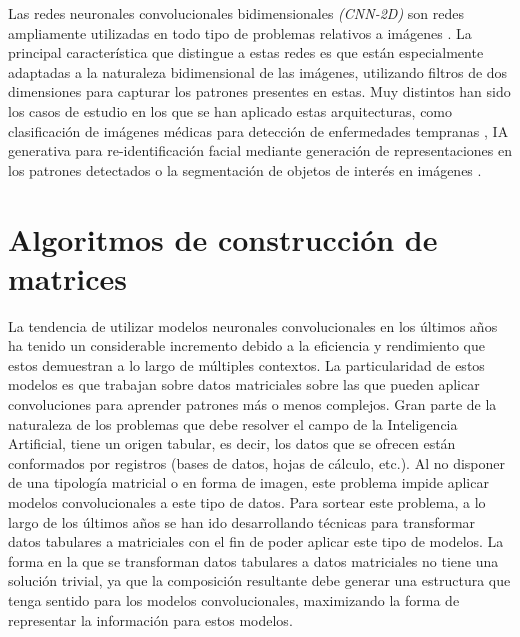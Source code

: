 Las redes neuronales convolucionales bidimensionales \textit{(CNN-2D)} son redes ampliamente utilizadas en todo tipo de problemas relativos a imágenes \cite{9451544}. La principal característica que distingue a estas redes es que están especialmente adaptadas a la naturaleza bidimensional de las imágenes, utilizando filtros de dos dimensiones para capturar los patrones presentes en estas. Muy distintos han sido los casos de estudio en los que se han aplicado estas arquitecturas, como clasificación de imágenes médicas para detección de enfermedades tempranas \cite{7064414}, IA generativa para re-identificación facial \cite{6909616} mediante generación de representaciones en los patrones detectados o la segmentación de objetos de interés en imágenes \cite{long2015fully}.

\section{Algoritmos de construcción de matrices}
\label{SOAT_MATRIX_ALGORITHM_CONSTRUCTION}

La tendencia de utilizar modelos neuronales convolucionales en los últimos años ha tenido un considerable incremento debido a la eficiencia y rendimiento que estos demuestran a lo largo de múltiples contextos. La particularidad de estos modelos es que trabajan sobre datos matriciales sobre las que pueden aplicar convoluciones para aprender patrones más o menos complejos. Gran parte de la naturaleza de los problemas que debe resolver el campo de la Inteligencia Artificial, tiene un origen tabular, es decir, los datos que se ofrecen están conformados por registros (bases de datos, hojas de cálculo, etc.). Al no disponer de una tipología matricial o en forma de imagen, este problema impide aplicar modelos convolucionales a este tipo de datos. Para sortear este problema, a lo largo de los últimos años se han ido desarrollando técnicas para transformar datos tabulares a matriciales con el fin de poder aplicar este tipo de modelos. La forma en la que se transforman datos tabulares a datos matriciales no tiene una solución trivial, ya que la composición resultante debe generar una estructura que tenga sentido para los modelos convolucionales, maximizando la forma de representar la información para estos modelos. 

